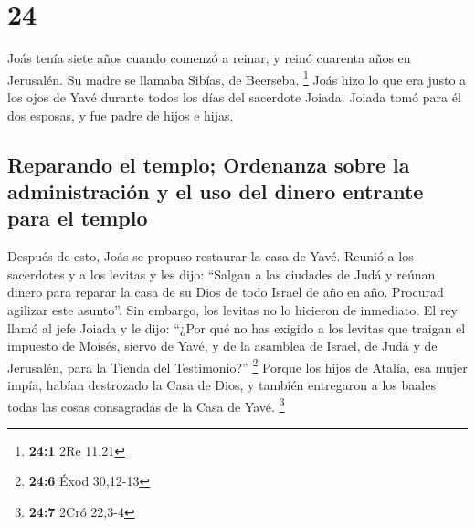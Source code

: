 \hypertarget{section-23}{%
\section{24}\label{section-23}}

 Joás tenía siete años cuando comenzó a reinar, y reinó
cuarenta años en Jerusalén. Su madre se llamaba Sibías, de Beerseba.
\footnote{\textbf{24:1} 2Re 11,21}  Joás hizo lo que era
justo a los ojos de Yavé durante todos los días del sacerdote Joiada.
 Joiada tomó para él dos esposas, y fue padre de hijos e
hijas.

\hypertarget{reparando-el-templo-ordenanza-sobre-la-administraciuxf3n-y-el-uso-del-dinero-entrante-para-el-templo}{%
\subsection{Reparando el templo; Ordenanza sobre la administración y el
uso del dinero entrante para el
templo}\label{reparando-el-templo-ordenanza-sobre-la-administraciuxf3n-y-el-uso-del-dinero-entrante-para-el-templo}}

 Después de esto, Joás se propuso restaurar la casa de
Yavé.  Reunió a los sacerdotes y a los levitas y les dijo:
``Salgan a las ciudades de Judá y reúnan dinero para reparar la casa de
su Dios de todo Israel de año en año. Procurad agilizar este asunto''.
Sin embargo, los levitas no lo hicieron de inmediato.  El
rey llamó al jefe Joiada y le dijo: ``¿Por qué no has exigido a los
levitas que traigan el impuesto de Moisés, siervo de Yavé, y de la
asamblea de Israel, de Judá y de Jerusalén, para la Tienda del
Testimonio?'' \footnote{\textbf{24:6} Éxod 30,12-13} 
Porque los hijos de Atalía, esa mujer impía, habían destrozado la Casa
de Dios, y también entregaron a los baales todas las cosas consagradas
de la Casa de Yavé. \footnote{\textbf{24:7} 2Cró 22,3-4}

